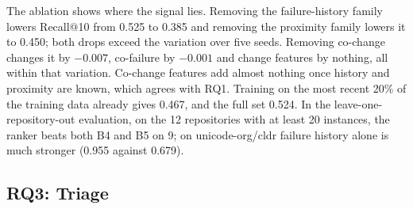 \documentclass[10pt,conference]{IEEEtran}
\begin{document}
The ablation shows where the signal lies. Removing the failure-history family lowers Recall@10 from 0.525 to 0.385 and removing the proximity family lowers it to 0.450; both drops exceed the variation over five seeds. Removing co-change changes it by $-0.007$, co-failure by $-0.001$ and change features by nothing, all within that variation. Co-change features add almost nothing once history and proximity are known, which agrees with RQ1. Training on the most recent 20\% of the training data already gives 0.467, and the full set 0.524. In the leave-one-repository-out evaluation, on the 12 repositories with at least 20 instances, the ranker beats both B4 and B5 on 9; on unicode-org/cldr failure history alone is much stronger (0.955 against 0.679).

\subsection{RQ3: Triage}
\label{sec:rq3}

\begin{table}[t]
\caption{RQ3: Triage, Pooled Leave-One-Repository-Out over 4,384 Failing Pairs (216 Not Mine, 4,168 Mine)}
\label{tab:e2}
\centering
\scriptsize
\setlength{\tabcolsep}{3pt}
\end{table}
\end{document}
